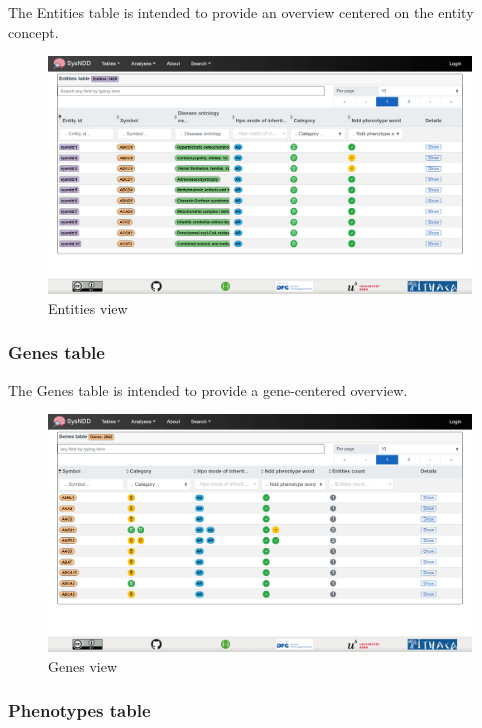 \documentclass[
]{article}
\begin{document}
The Entities table is intended to provide an overview centered on the entity concept.

\begin{figure}
\centering
\includegraphics{./static/img/02_07-sysndd.dbmr.unibe.ch_Entities.png}
\caption{Entities view}
\end{figure}

\hypertarget{genes-table}{%
\subsubsection{Genes table}\label{genes-table}}

The Genes table is intended to provide a gene-centered overview.

\begin{figure}
\centering
\includegraphics{./static/img/02_08-sysndd.dbmr.unibe.ch_Genes.png}
\caption{Genes view}
\end{figure}

\hypertarget{phenotypes-table}{%
\subsubsection{Phenotypes table}\label{phenotypes-table}}
\end{document}
